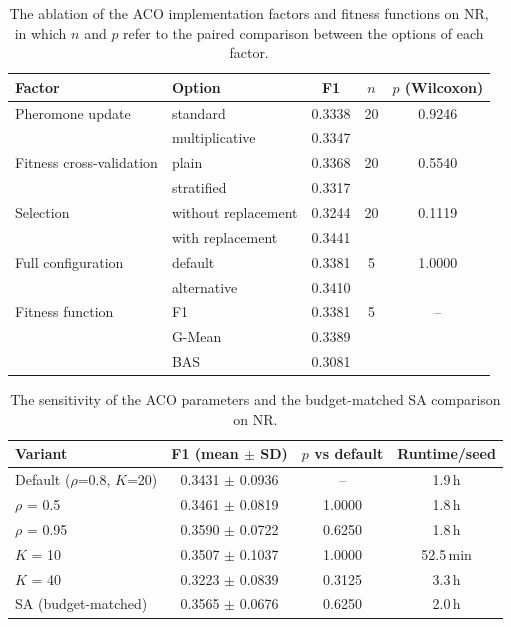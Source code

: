 \documentclass[pdflatex,sn-basic]{sn-jnl}
\begin{document}
\begin{table}[htbp]
\centering
\caption{The ablation of the ACO implementation factors and fitness
functions on NR, in which $n$ and $p$ refer to the paired comparison
between the options of each factor.}
\label{tab:ablation}
\footnotesize
\begin{tabular}{llccc}
\toprule
Factor & Option & F1 & $n$ & $p$ (Wilcoxon) \\
\midrule
Pheromone update & standard & 0.3338 & 20 & 0.9246 \\
 & multiplicative & 0.3347 &  &  \\
Fitness cross-validation & plain & 0.3368 & 20 & 0.5540 \\
 & stratified & 0.3317 &  &  \\
Selection & without replacement & 0.3244 & 20 & 0.1119 \\
 & with replacement & 0.3441 &  &  \\
Full configuration & default & 0.3381 & 5 & 1.0000 \\
 & alternative & 0.3410 &  &  \\
\midrule
Fitness function & F1 & 0.3381 & 5 & -- \\
 & G-Mean & 0.3389 &  &  \\
 & BAS & 0.3081 &  &  \\
\bottomrule
\end{tabular}
\end{table}

\begin{table}[htbp]
\centering
\caption{The sensitivity of the ACO parameters and the budget-matched SA
comparison on NR.}
\label{tab:sensitivity}
\begin{tabular}{lccc}
\toprule
Variant & F1 (mean $\pm$ SD) & $p$ vs default & Runtime/seed \\
\midrule
Default ($\rho$=0.8, $K$=20) & 0.3431 $\pm$ 0.0936 & -- & 1.9\,h \\
$\rho$ = 0.5 & 0.3461 $\pm$ 0.0819 & 1.0000 & 1.8\,h \\
$\rho$ = 0.95 & 0.3590 $\pm$ 0.0722 & 0.6250 & 1.8\,h \\
$K$ = 10 & 0.3507 $\pm$ 0.1037 & 1.0000 & 52.5\,min \\
$K$ = 40 & 0.3223 $\pm$ 0.0839 & 0.3125 & 3.3\,h \\
SA (budget-matched) & 0.3565 $\pm$ 0.0676 & 0.6250 & 2.0\,h \\
\bottomrule
\end{tabular}
\end{table}
\end{document}
